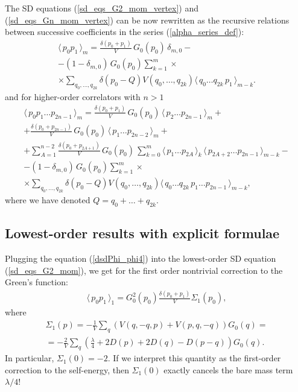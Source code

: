 \documentclass[12pt]{article}
\newcommand{\lr}[1]{ \left( #1 \right) }
\newcommand{\vev}[1]{ \langle \, #1 \, \rangle }
\begin{document}
The SD equations (\ref{sd_eqs_G2_mom_vertex}) and (\ref{sd_eqs_Gn_mom_vertex}) can be now rewritten as the recursive relations between successive coefficients in the series (\ref{alpha_series_def}):
\begin{eqnarray}
\label{sd_eqs_G2_mom_vertex_alg}
 \vev{p_0 p_1}_m = \frac{\delta\lr{p_0 + p_1}}{V} \, G_0\lr{p_0} \, \delta_{m,0}
 - \nonumber \\ -
 \lr{1 - \delta_{m,0}} \,
 G_0\lr{p_0} \sum\limits_{k=1}^{m}
 \times \nonumber \\ \times
 \sum\limits_{q_0, \ldots, q_{2 k}}
 \delta\lr{p_0 - Q}
 V\lr{q_0, \ldots, q_{2 k}}
 \vev{q_0 \ldots q_{2 k} \, p_1}_{m-k} .
\end{eqnarray}
and for higher-order correlators with $n > 1$
\begin{eqnarray}
\label{sd_eqs_Gn_mom_vertex_alg}
 \vev{p_0 p_1 \ldots p_{2n-1}}_m
 =
 \frac{\delta\lr{p_0 + p_1}}{V} \, G_0\lr{p_0} \, \vev{p_2 \ldots p_{2n-1}}_m
 + \nonumber \\ +
 \frac{\delta\lr{p_0 + p_{2n-1}}}{V} \, G_0\lr{p_0} \, \vev{p_1 \ldots p_{2n-2}}_m
 + \nonumber \\ +
 \sum\limits_{A=1}^{n-2}
 \frac{\delta\lr{p_0 + p_{2A+1}}}{V} \, G_0\lr{p_0} \,
 \sum\limits_{k=0}^m
 \vev{p_1 \ldots p_{2A}}_k \, \vev{p_{2 A+2} \ldots p_{2n-1}}_{m-k}
 - \nonumber \\ -
 \lr{1 - \delta_{m,0}} \,
 G_0\lr{p_0} \sum\limits_{k=1}^{m}
 \times \nonumber \\ \times
 \sum\limits_{q_0, \ldots, q_{2 k}}
 \delta\lr{p_0 - Q}
 V\lr{q_0, \ldots, q_{2 k}}
 \vev{q_0 \ldots q_{2 k} \, p_1  \ldots p_{2n-1}}_{m-k} ,
\end{eqnarray}
where we have denoted $Q = q_0 + \ldots + q_{2 k}$.

\subsection{Lowest-order results with explicit formulae}

 Plugging the equation (\ref{dsdPhi_phi4}) into the lowest-order SD equation (\ref{sd_eqs_G2_mom}), we get for the first order nontrivial correction to the Green's function:
\begin{eqnarray}
\label{p0p1_1}
 \vev{p_0 p_1}_1 = G_0^2\lr{p_0} \frac{\delta\lr{p_0 + p_1}}{V} \Sigma_1\lr{p_0} ,
\end{eqnarray}
where
\begin{eqnarray}
\label{sigma_1}
 \Sigma_1\lr{p} = -\frac{1}{V} \sum\limits_q \lr{V\lr{q, -q, p} + V\lr{p, q, -q}} G_0\lr{q}
 = \nonumber \\ =
 -\frac{2}{V} \sum\limits_q \lr{\frac{\lambda}{4} + 2 D\lr{p} + 2 D\lr{q} - D\lr{p-q}} G_0\lr{q} .
\end{eqnarray}
In particular, $\Sigma_1\lr{0} = -2$. If we interpret this quantity as the first-order correction to the self-energy, then $\Sigma_1\lr{0}$ exactly cancels the bare mass term $\lambda/4$!
\end{document}
